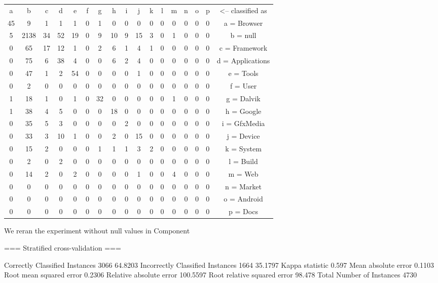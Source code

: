 \begin{tabular}{|c|c|c|c|c|c|c|c|c|c|c|c|c|c|c|c|c|}
a & b & c & d & e & f & g & h & i & j & k & l & m & n & o & p   &<-- classified as\\
45 & 9 & 1 & 1 & 1 & 0 & 1 & 0 & 0 & 0 & 0 & 0 & 0 & 0 & 0 & 0 &  a = Browser\\
5&2138 & 34 & 52 & 19 & 0 & 9 & 10 & 9 & 15 & 3 & 0 & 1 & 0 & 0 & 0 &  b = null\\
0 & 65 & 17 & 12 & 1 & 0 & 2 & 6 & 1 & 4 & 1 & 0 & 0 & 0 & 0 & 0 &  c = Framework\\
0 & 75 & 6 & 38 & 4 & 0 & 0 & 6 & 2 & 4 & 0 & 0 & 0 & 0 & 0 & 0 &  d = Applications\\
0 & 47 & 1 & 2 & 54 & 0 & 0 & 0 & 0 & 1 & 0 & 0 & 0 & 0 & 0 & 0 &  e = Tools\\
0 & 2 & 0 & 0 & 0 & 0 & 0 & 0 & 0 & 0 & 0 & 0 & 0 & 0 & 0 & 0 &  f = User\\
1 & 18 & 1 & 0 & 1 & 0 & 32 & 0 & 0 & 0 & 0 & 0 & 1 & 0 & 0 & 0 &  g = Dalvik\\
1 & 38 & 4 & 5 & 0 & 0 & 0 & 18 & 0 & 0 & 0 & 0 & 0 & 0 & 0 & 0 &  h = Google\\
0 & 35 & 5 & 3 & 0 & 0 & 0 & 0 & 2 & 0 & 0 & 0 & 0 & 0 & 0 & 0 &  i = GfxMedia\\
0 & 33 & 3 & 10 & 1 & 0 & 0 & 2 & 0 & 15 & 0 & 0 & 0 & 0 & 0 & 0 &  j = Device\\
0 & 15 & 2 & 0 & 0 & 0 & 1 & 1 & 1 & 3 & 2 & 0 & 0 & 0 & 0 & 0 &  k = System\\
0 & 2 & 0 & 2 & 0 & 0 & 0 & 0 & 0 & 0 & 0 & 0 & 0 & 0 & 0 & 0 &  l = Build\\
0 & 14 & 2 & 0 & 2 & 0 & 0 & 0 & 0 & 1 & 0 & 0 & 4 & 0 & 0 & 0 &  m = Web\\
0 & 0 & 0 & 0 & 0 & 0 & 0 & 0 & 0 & 0 & 0 & 0 & 0 & 0 & 0 & 0 &  n = Market\\
0 & 0 & 0 & 0 & 0 & 0 & 0 & 0 & 0 & 0 & 0 & 0 & 0 & 0 & 0 & 0 &  o = Android\\
0 & 0 & 0 & 0 & 0 & 0 & 0 & 0 & 0 & 0 & 0 & 0 & 0 & 0 & 0 & 0 &  p = Docs\\
\end{tabular}

    \item We reran the experiment without null values in Component 

=== Stratified cross-validation ===

Correctly Classified Instances        3066               64.8203 %
Incorrectly Classified Instances      1664               35.1797 %
Kappa statistic                          0.597 
Mean absolute error                      0.1103
Root mean squared error                  0.2306
Relative absolute error                100.5597 %
Root relative squared error             98.478  %
Total Number of Instances             4730     


